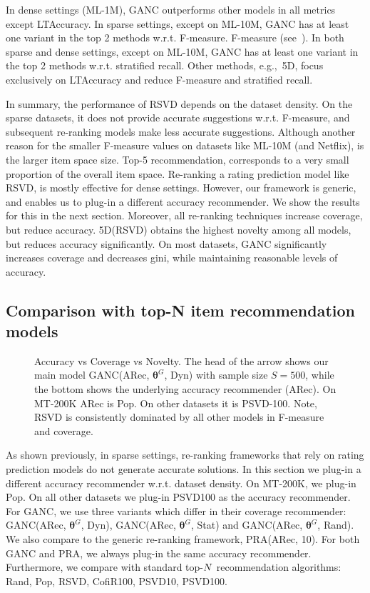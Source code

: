 In dense settings (ML-1M), GANC outperforms other models in all metrics except LTAccuracy. In sparse settings, except on ML-10M,  GANC has at least one variant in the top 2 methods w.r.t.  \iffullpaper F-measure. \else F-measure (see~\cite{ourFullVersion}). \fi  In both sparse and dense settings, except on ML-10M, GANC has at least one variant in the top 2 methods w.r.t.  stratified recall. Other methods, e.g.,~5D, focus exclusively on LTAccuracy and  reduce F-measure and stratified recall. 

In summary, the performance of  RSVD depends on the dataset density. On the sparse datasets, it  does not provide accurate suggestions w.r.t. F-measure, and subsequent re-ranking models make less accurate suggestions.  Although another reason for the smaller F-measure values on  datasets like  ML-10M (and Netflix), is the larger item space size. Top-5 recommendation, corresponds to a very small proportion of the overall item space. Re-ranking a rating prediction model like RSVD, is mostly effective for  dense settings.  However, our framework is generic,  and enables us to plug-in a different accuracy recommender. We show the results for this in the next section.   Moreover, all re-ranking techniques increase coverage, but reduce accuracy. 5D(RSVD) obtains the highest novelty among all models, but reduces accuracy significantly. On most datasets, GANC significantly increases coverage and decreases gini, while maintaining reasonable levels of accuracy.  

\subsection{Comparison with top-N item recommendation models}
\label{sec:top-nrecommendation}

\begin{figure*}[t]	
\centering

\caption{Accuracy vs Coverage vs Novelty. The head of the arrow shows our main model GANC(ARec, $\bm{\theta}^G$, Dyn) with sample size  $S=500$, while the bottom shows the underlying accuracy recommender (ARec).   On MT-200K ARec is Pop. On other datasets it is PSVD-100.  Note, RSVD is consistently dominated by all other models in F-measure and coverage.  }
\label{fig:pcn}
\end{figure*}	

As shown previously, in sparse settings, re-ranking frameworks that rely on rating prediction models do not generate accurate solutions. In this section we plug-in a different accuracy recommender w.r.t. dataset density. 
On MT-200K,  we  plug-in  Pop. On all other datasets we plug-in  PSVD100 as the accuracy recommender.
 For GANC, we use three variants which differ in their coverage recommender: GANC(ARec, $\bm{\theta}^G$, Dyn), GANC(ARec, $\bm{\theta}^G$, Stat) and GANC(ARec, $\bm{\theta}^G$, Rand). We also compare to the generic re-ranking framework, PRA(ARec, 10). For both GANC and PRA, we always plug-in the same accuracy recommender. Furthermore, we compare with standard top-$N$ recommendation algorithms:  Rand, Pop, RSVD, CofiR100, PSVD10, PSVD100.  


